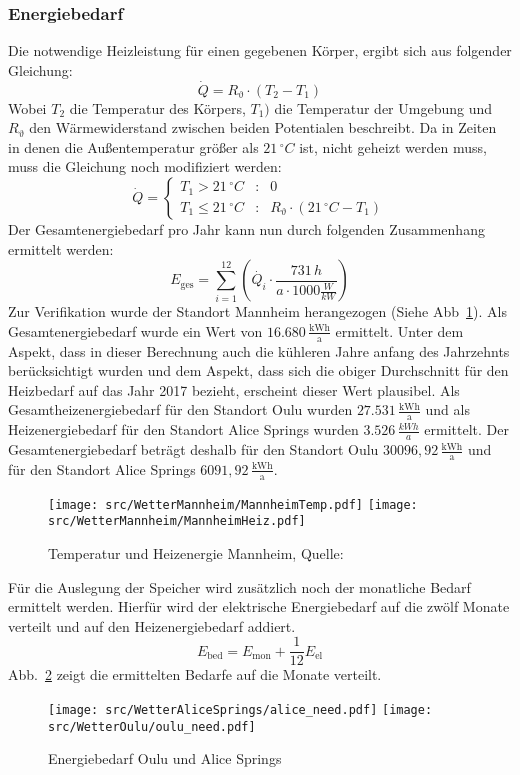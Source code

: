 \subsubsection{Energiebedarf}
  Die notwendige Heizleistung für einen gegebenen Körper, ergibt sich aus folgender Gleichung:
  \[\dot{Q} = R_\mathrm{\vartheta} \cdot (T_\mathrm{2} - T_\mathrm{1})\]
  Wobei \(T_\mathrm{2}\) die Temperatur des Körpers, \( T_\mathrm{1})\) die Temperatur der Umgebung und \(R_\mathrm{\vartheta}\) den Wärmewiderstand zwischen beiden Potentialen beschreibt.
  Da in Zeiten in denen die Außentemperatur größer als \(21\,^\circ C\) ist, nicht geheizt werden muss, muss die Gleichung noch modifiziert werden:
  \[
  \dot{Q} = \left\{\begin{array}
    {rcl} T_1 > 21\,^\circ C&:& 0\\
    T_1 \leq 21\,^\circ C&:& R_\mathrm{\vartheta} \cdot (21\,^\circ C- T_1)
  \end{array}\right.
  \]
  Der Gesamtenergiebedarf pro Jahr kann nun durch folgenden Zusammenhang ermittelt werden:
  \[E_\mathrm{ges} = \sum_{i = 1}^{12}(\dot{Q_i} \cdot \frac{731\,h}{a \cdot 1000\frac{W}{kW}})\]
  Zur Verifikation wurde der Standort Mannheim herangezogen (Siehe Abb~\ref{fig:WTRMAN}).
  Als Gesamtenergiebedarf wurde ein Wert von \(\mathrm{16.680\,\frac{kWh}{a}}\) ermittelt.
  Unter dem Aspekt, dass in dieser Berechnung auch die kühleren Jahre anfang des Jahrzehnts berücksichtigt wurden und dem Aspekt, dass sich die obiger Durchschnitt für den Heizbedarf auf das Jahr 2017 bezieht, erscheint dieser Wert plausibel.
  Als Gesamtheizenergiebedarf für den Standort Oulu wurden \(\mathrm{27.531\,\frac{kWh}{a}}\) und als Heizenergiebedarf für den Standort Alice Springs wurden \(3.526\,\frac{kWh}{a}\) ermittelt.
  Der Gesamtenergiebedarf beträgt deshalb für den Standort Oulu \(\mathrm{30096,92\,\frac{kWh}{a}}\) und für den Standort Alice Springs \(\mathrm{6091,92\,\frac{kWh}{a}}\).
  \begin{figure}[h]
    \centering 
    \texttt{[image: src/WetterMannheim/MannheimTemp.pdf]}
    \texttt{[image: src/WetterMannheim/MannheimHeiz.pdf]}
    \caption[Temperaturen Mannheim]{Temperatur und Heizenergie Mannheim, Quelle:\cite{Webp:WWOMAN}}\label{fig:WTRMAN}
  \end{figure}

  Für die Auslegung der Speicher wird zusätzlich noch der monatliche Bedarf ermittelt werden.
  Hierfür wird der elektrische Energiebedarf auf die zwölf Monate verteilt und auf den Heizenergiebedarf addiert.
  \[E_\mathrm{bed} = E_\mathrm{mon} + \frac{1}{12} E_\mathrm{el}\]
  Abb.~\ref{fig:EBED} zeigt die ermittelten Bedarfe auf die Monate verteilt.
  \begin{figure}
    \centering
    \texttt{[image: src/WetterAliceSprings/alice\_need.pdf]}
    \texttt{[image: src/WetterOulu/oulu\_need.pdf]}
    \caption{Energiebedarf Oulu und Alice Springs}\label{fig:EBED}
  \end{figure}

